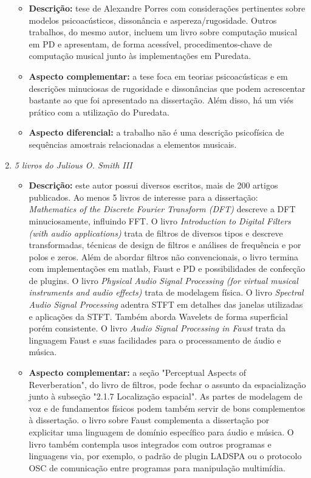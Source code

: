 \begin{enumerate}
\begin{itemize}
            \item {\bf Descrição:} tese de Alexandre Porres com considerações pertinentes sobre modelos psicoacústicos, dissonância e aspereza/rugosidade. Outros trabalhos, do mesmo autor, incluem um livro sobre computação musical em PD e apresentam, de forma acessível, procedimentos-chave de computação musical junto às implementações em Puredata.
            \item {\bf Aspecto complementar:} a tese foca em teorias psicoacústicas e em descrições minuciosas de rugosidade e dissonâncias que podem acrescentar bastante ao que foi apresentado na dissertação. Além disso, há um viés prático com a utilização do Puredata.
            \item {\bf Aspecto diferencial:} a trabalho não é uma descrição psicofísica de sequências amostrais relacionadas a elementos musicais.
        \end{itemize}
    \item \emph{5 livros do Julious O. Smith III}\cite{JOSFaust,JOSSpec,JOSFilt,JOSPhy,JOSFM}
        \begin{itemize}
            \item {\bf Descrição:} este autor possui diversos escritos, mais de 200 artigos publicados. Ao menos 5 livros de interesse para a dissertação: \emph{Mathematics of the Discrete Fourier Transform (DFT)} descreve a DFT minuciosamente, influindo FFT. O livro \emph{Introduction to Digital Filters (with audio applications)} trata de filtros de diversos tipos e descreve transformadas, técnicas de design de filtros e análises de frequência e por polos e zeros. Além de abordar filtros não convencionais, o livro termina com implementações em matlab, Faust e PD e possibilidades de confecção de plugins. O livro \emph{Physical Audio Signal Processing (for virtual musical instruments and audio effects)} trata de modelagem física. O livro \emph{Spectral Audio Signal Processing} adentra STFT em detalhes das janelas utilizadas e aplicações da STFT. Também aborda Wavelets de forma superficial porém consistente. O livro \emph{Audio Signal Processing in Faust} trata da linguagem Faust e suas facilidades para o processamento de áudio e música.
            \item {\bf Aspecto complementar:} a seção "Perceptual Aspects of Reverberation", do livro de filtros, pode fechar o assunto da espacialização junto à subseção "2.1.7 Localização espacial". As partes de modelagem de voz e de fundamentos físicos podem também servir de bons  complementos à dissertação. o livro sobre Faust complementa a dissertação por explicitar uma linguagem de domínio específico para áudio e música. O livro também contempla usos integrados com outros programas e linguagens via, por exemplo, o padrão de plugin LADSPA ou o protocolo OSC de comunicação entre programas para manipulação multimídia. 

\end{itemize}
\end{enumerate}
